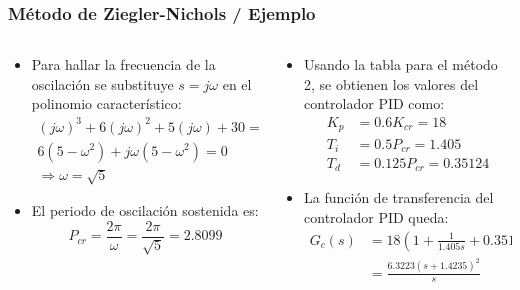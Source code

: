 \documentclass[aspectratio=169,handout]{beamer}
\theoremstyle{definition}
\theoremstyle{plain}
\theoremstyle{remark}
\begin{document}
\begin{frame}[<+->]\frametitle{Método de Ziegler-Nichols / Ejemplo}
\begin{columns}
\begin{column}{0.5\textwidth}
\small
\begin{itemize}
	\item Para hallar la frecuencia de la oscilación se substituye $s = j\omega$ en el polinomio característico:
	\begin{align*}
		(j\omega)^3 + 6(j\omega)^2 + 5(j\omega) + 30 = 0\\
		6(5 - \omega^2) + j\omega(5-\omega^2) = 0\\
		\Rightarrow \omega = \sqrt{5}
	\end{align*}
	\item El periodo de oscilación sostenida es:
	\begin{equation*}
		P_{cr} = \frac{2\pi}{\omega} = \frac{2\pi}{\sqrt{5}} = 2.8099
	\end{equation*}
\end{itemize}
\end{column}
\begin{column}{0.5\textwidth}
\small
\begin{itemize}
	\item Usando la tabla para el método 2, se obtienen los valores del controlador PID como:
	\begin{align*}
		K_p &= 0.6 K_{cr} = 18\\
		T_i &= 0.5 P_{cr} = 1.405\\
		T_d &= 0.125P_{cr} = 0.35124
	\end{align*}
	\item La función de transferencia del controlador PID queda:
	\begin{align*}
		G_c(s) &= 18 \left( 1 + \frac{1}{1.405s} + 0.35124 s \right)\\
		&= \frac{6.3223(s+1.4235)^2}{s}
	\end{align*}
\end{itemize}
\end{column}
\end{columns}
\end{frame}
\end{document}
